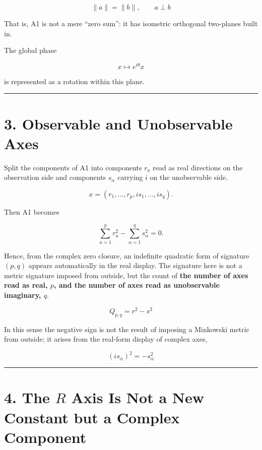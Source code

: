 \documentclass[
  a4paper,
]{article}
\begin{document}
\[
\boxed{
\|a\|=\|b\|,
\qquad
a\perp b
}
\]

That is, A1 is not a mere ``zero sum'': it has isometric orthogonal
two-planes built in.

The global phase

\[
x\mapsto e^{i\theta}x
\]

is represented as a rotation within this plane.

\begin{center}\rule{0.5\linewidth}{0.5pt}\end{center}

\section{3. Observable and Unobservable
Axes}\label{observable-and-unobservable-axes}

Split the components of A1 into components \(r_a\) read as real
directions on the observation side and components \(s_\alpha\) carrying
\(i\) on the unobservable side.

\[
x=
(r_1,\ldots,r_p,
is_1,\ldots,is_q).
\]

Then A1 becomes

\[
\sum_{a=1}^{p}r_a^2
-
\sum_{\alpha=1}^{q}s_\alpha^2
=0.
\]

Hence, from the complex zero closure, an indefinite quadratic form of
signature \((p,q)\) appears automatically in the real display. The
signature here is not a metric signature imposed from outside, but the
count of \textbf{the number of axes read as real, \(p\), and the number
of axes read as unobservable imaginary, \(q\)}.

\[
\boxed{
Q_{p,q}
=
r^2-s^2
}
\]

In this sense the negative sign is not the result of imposing a
Minkowski metric from outside; it arises from the real-form display of
complex axes,

\[
\boxed{
(i s_\alpha)^2=-s_\alpha^2
}
\]

\begin{center}\rule{0.5\linewidth}{0.5pt}\end{center}

\section{\texorpdfstring{4. The \(R\) Axis Is Not a New Constant but a
Complex
Component}{4. The R Axis Is Not a New Constant but a Complex Component}}\label{the-r-axis-is-not-a-new-constant-but-a-complex-component}
\end{document}
